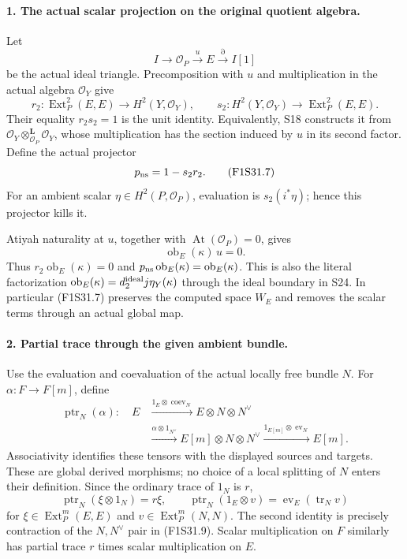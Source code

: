 \paragraph{1. The actual scalar projection on the original quotient algebra.}
Let
\[
 I\longrightarrow\mathcal O_P\xrightarrow{u}E
                  \xrightarrow{\partial}I[1]
 \tag{F1S31.5}
\]
be the actual ideal triangle. Precomposition with $u$ and
multiplication in the actual algebra $\mathcal O_Y$ give
\[
 r_2:\operatorname{Ext}^2_P(E,E)\longrightarrow
                           H^2(Y,\mathcal O_Y),\qquad
 s_2:H^2(Y,\mathcal O_Y)\longrightarrow
                           \operatorname{Ext}^2_P(E,E).
 \tag{F1S31.6}
\]
Their equality $r_2s_2=1$ is the unit identity.
Equivalently, S18 constructs it from
$\mathcal O_Y\otimes^{\mathbf L}_{\mathcal O_P}\mathcal O_Y$,
whose multiplication has the section induced by $u$
in its second factor. Define the actual projector
\[
                  p_{\rm ns}=1-s_2r_2.
 \tag{F1S31.7}
\]
For an ambient scalar $\eta\in H^2(P,\mathcal O_P)$,
evaluation is $s_2(i^*\eta)$; hence this projector kills it.

Atiyah naturality at $u$, together with
$\operatorname{At}(\mathcal O_P)=0$, gives
\[
               \operatorname{ob}_E(\kappa)\,u=0.
 \tag{F1S31.8}
\]
Thus $r_2\operatorname{ob}_E(\kappa)=0$ and
$p_{\rm ns}\operatorname{ob}_E(\kappa)
=\operatorname{ob}_E(\kappa)$.
This is also the literal factorization
$\operatorname{ob}_E(\kappa)
=d^{\rm ideal}_2j\eta_Y(\kappa)$ through the ideal
boundary in S24. In particular (F1S31.7) preserves
the computed space $W_E$ and removes the scalar
terms through an actual global map.

\paragraph{2. Partial trace through the given ambient bundle.}
Use the evaluation and coevaluation of the actual
locally free bundle $N$. For
$\alpha:F\to F[m]$, define
\[
\begin{split}
 \operatorname{ptr}_N(\alpha):\quad
 E&\xrightarrow{1_E\otimes\operatorname{coev}_N}
                  E\otimes N\otimes N^\vee\\
  &\xrightarrow{\alpha\otimes1_{N^\vee}}
                  E[m]\otimes N\otimes N^\vee
   \xrightarrow{1_{E[m]}\otimes\operatorname{ev}_N}E[m].
\end{split}
 \tag{F1S31.9}
\]
Associativity identifies these tensors with the displayed
sources and targets. These are global derived morphisms;
no choice of a local splitting of $N$ enters their
definition. Since the ordinary trace of $1_N$ is $r$,
\[
 \operatorname{ptr}_N(\xi\otimes1_N)=r\xi,\qquad
 \operatorname{ptr}_N(1_E\otimes v)
                          =\operatorname{ev}_E(\operatorname{tr}_N v)
 \tag{F1S31.10}
\]
for $\xi\in\operatorname{Ext}^m_P(E,E)$ and
$v\in\operatorname{Ext}^m_P(N,N)$.
The second identity is precisely contraction of the
$N,N^\vee$ pair in (F1S31.9). Scalar multiplication
on $F$ similarly has partial trace $r$ times scalar
multiplication on $E$.

